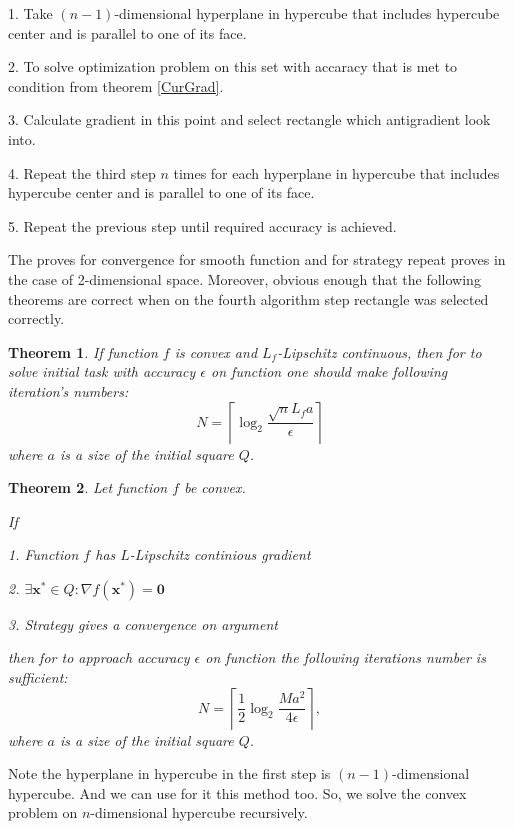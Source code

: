 \documentclass[12pt]{article}
\newtheorem{theorem}{Theorem}[section]
\begin{document}
1. Take $(n-1)$-dimensional hyperplane in hypercube that includes hypercube center and is parallel to one of its face.

2. To solve optimization problem on this set with accaracy that is met to condition from theorem \ref{CurGrad}.

3. Calculate gradient in this point and select rectangle which antigradient look into.

4. Repeat the third step $n$ times for each hyperplane in hypercube that includes hypercube center and is parallel to one of its face.

5. Repeat the previous step until required accuracy is achieved.

The proves for convergence for smooth function and for strategy repeat proves in the case of 2-dimensional space. Moreover, obvious enough that the following theorems are correct when on the fourth algorithm step rectangle was selected correctly.

\begin{theorem}
If function $f$ is convex and $L_f$-Lipschitz continuous, then for to solve initial task with accuracy $\epsilon$ on function one should make following iteration's numbers:
\begin{equation}N = \left\lceil\log_2\frac{\sqrt{n}L_fa}{\epsilon}\right\rceil\end{equation}
where $a$ is a size of the initial square $Q$.
\end{theorem}

\begin{theorem}
Let function $f$ be convex.

If

1. Function $f$ has $L$-Lipschitz continious gradient

2. $\exists \textbf{x}^*\in Q: \nabla f(\textbf{x}^*) = \textbf{0}$

3. Strategy gives a convergence on argument

then for to approach accuracy $\epsilon$ on function the following iterations number is sufficient:
\begin{equation}N = \left\lceil\frac{1}{2}\log_2\frac{Ma^2}{4\epsilon}\right\rceil,\end{equation}
where $a$ is a size of the initial square $Q$.
\end{theorem}

Note the hyperplane in hypercube in the first step is $(n-1)$-dimensional hypercube. And we can use for it this method too. So, we solve the convex problem on $n$-dimensional hypercube recursively.
\end{document}
